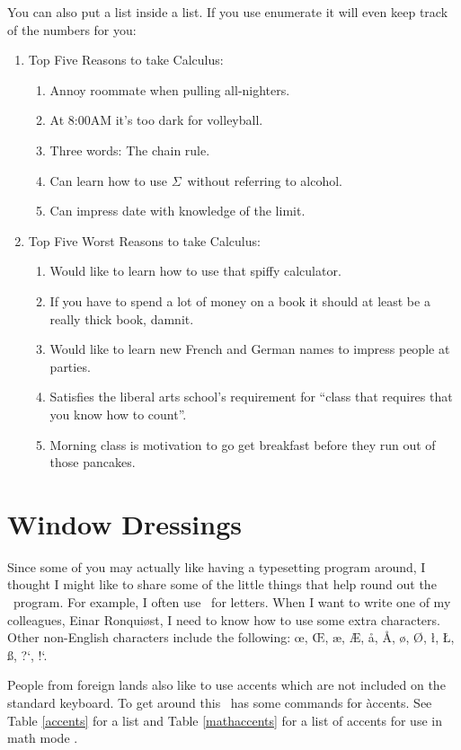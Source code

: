 You can also put a list inside a list.  If you use
enumerate it will even keep track of the numbers for you:
\begin{enumerate}
\item Top Five Reasons to take Calculus:
    \begin{enumerate}
     \item Annoy roommate when pulling all-nighters.
     \item At 8:00AM it's too dark for volleyball.
     \item Three words: The chain rule.
     \item Can learn how to use $\Sigma$\  without 
           referring to alcohol.
     \item Can impress date with knowledge of the limit.
     \end{enumerate}
\item Top Five Worst Reasons to take Calculus:
     \begin{enumerate}
     \item Would like to learn how to use that spiffy calculator.
     \item If you have to spend a lot of money on a book it should
             at least be a really thick book, damnit.
     \item Would like to learn new French and German names to
             impress people at parties.
     \item Satisfies the liberal arts school's requirement
           for ``class that requires that you know how to  count''.
     \item Morning class is motivation to go get breakfast 
           before they run out of those pancakes.
     \end{enumerate}
\end{enumerate}


\section{Window Dressings}
Since some of you may actually like having a typesetting
program around, I thought I might like to share some
of the little things that help round out the \lat\ program.
For example, I often use \lat\ for letters.  When I want
to write one of my colleagues, Einar Ronqui\o st, I need
to know how to use some extra characters.  Other non-English
characters include the following: \oe, \OE, \ae,
\AE, \aa, \AA, \o, \O, \l, \L, \ss,
?`, !`.

People from foreign lands also like to use accents which
are not included on the standard keyboard.  To get around
this \lat\ has some commands for \`{a}ccents.  See Table
\ref{accents} for a list \cite[p. 40 (blatant rip-off)]{The-Manual}
and Table \ref{mathaccents} for a list of accents for use
in math mode \cite[p. 51]{The-Manual}.

